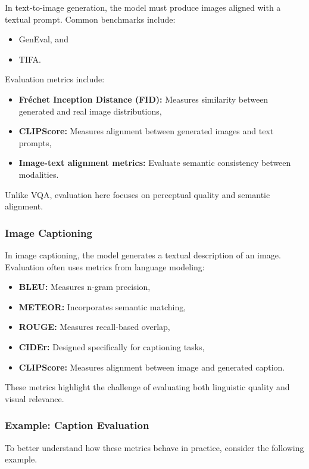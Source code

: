 \documentclass{article}
\begin{document}
In text-to-image generation, the model must produce images aligned with a textual prompt. Common benchmarks include:
\begin{itemize}
    \item GenEval, and
    \item TIFA.
\end{itemize}

Evaluation metrics include:
\begin{itemize}
    \item \textbf{Fréchet Inception Distance (FID):} Measures similarity between generated and real image distributions,
    \item \textbf{CLIPScore:} Measures alignment between generated images and text prompts,
    \item \textbf{Image-text alignment metrics:} Evaluate semantic consistency between modalities.
\end{itemize}

Unlike VQA, evaluation here focuses on perceptual quality and semantic alignment.

\subsubsection{Image Captioning}

In image captioning, the model generates a textual description of an image. Evaluation often uses metrics from language modeling:
\begin{itemize}
    \item \textbf{BLEU:} Measures n-gram precision,
    \item \textbf{METEOR:} Incorporates semantic matching,
    \item \textbf{ROUGE:} Measures recall-based overlap,
    \item \textbf{CIDEr:} Designed specifically for captioning tasks,
    \item \textbf{CLIPScore:} Measures alignment between image and generated caption.
\end{itemize}

These metrics highlight the challenge of evaluating both linguistic quality and visual relevance.

\subsubsection{Example: Caption Evaluation}

To better understand how these metrics behave in practice, consider the following example.
\end{document}
